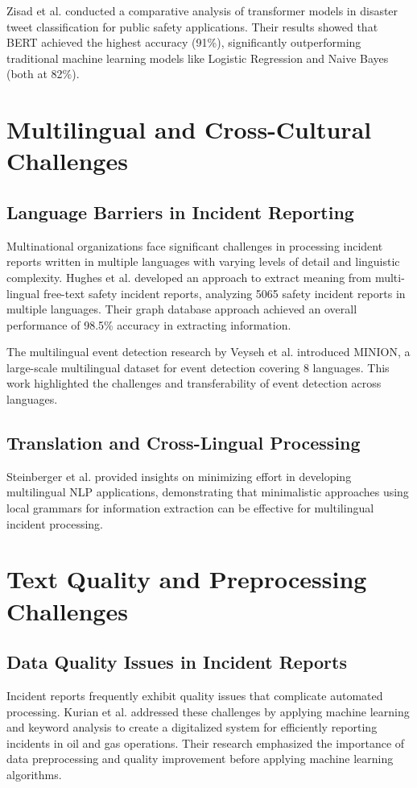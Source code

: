 \documentclass[11pt, titlepage, bibliography=totoc]{scrreprt}
\begin{document}
Zisad et al. \cite{zisad2025} conducted a comparative analysis of transformer models in disaster tweet classification for public safety applications. Their results showed that BERT achieved the highest accuracy (91\%), significantly outperforming traditional machine learning models like Logistic Regression and Naive Bayes (both at 82\%).

\section{Multilingual and Cross-Cultural Challenges}

\subsection{Language Barriers in Incident Reporting}
Multinational organizations face significant challenges in processing incident reports written in multiple languages with varying levels of detail and linguistic complexity. Hughes et al. \cite{hughes2019} developed an approach to extract meaning from multi-lingual free-text safety incident reports, analyzing 5065 safety incident reports in multiple languages. Their graph database approach achieved an overall performance of 98.5\% accuracy in extracting information.

The multilingual event detection research by Veyseh et al. \cite{veyseh2022} introduced MINION, a large-scale multilingual dataset for event detection covering 8 languages. This work highlighted the challenges and transferability of event detection across languages.

\subsection{Translation and Cross-Lingual Processing}
Steinberger et al.\cite{steinberger2006} provided insights on minimizing effort in developing multilingual NLP applications, demonstrating that minimalistic approaches using local grammars for information extraction can be effective for multilingual incident processing.

\section{Text Quality and Preprocessing Challenges}

\subsection{Data Quality Issues in Incident Reports}
Incident reports frequently exhibit quality issues that complicate automated processing. Kurian et al. \cite{4_Kurian} addressed these challenges by applying machine learning and keyword analysis to create a digitalized system for efficiently reporting incidents in oil and gas operations. Their research emphasized the importance of data preprocessing and quality improvement before applying machine learning algorithms.
\end{document}
